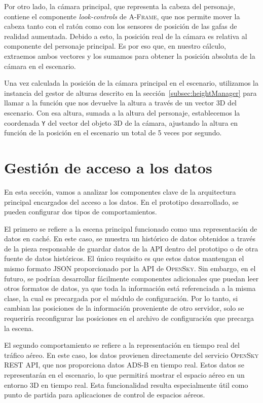 \documentclass[a4paper, 11pt]{book}
\begin{document}
Por otro lado, la cámara principal, que representa la cabeza del personaje, contiene el componente \emph{look-controls} de \textsc{A-Frame}, que nos permite mover la cabeza tanto con el ratón como con los sensores de posición de las gafas de realidad aumentada.
Debido a esto, la posición real de la cámara es relativa al componente del personaje principal. Es por eso que, en nuestro cálculo, extraemos ambos vectores y los sumamos para obtener la posición absoluta de la cámara en el escenario.

Una vez calculada la posición de la cámara principal en el escenario, utilizamos la instancia del gestor de alturas descrito en la sección~\ref{subsec:heightManager} para llamar a la función que nos devuelve la altura a través de un vector 3D del escenario. Con esa altura, sumada a la altura del personaje, establecemos la coordenada \texttt{Y} del vector del objeto \textsc{3D} de la cámara, ajustando la altura en función de la posición en el escenario un total de 5 veces por segundo.

\section{Gestión de acceso a los datos}
\label{sec:data}
En esta sección, vamos a analizar los componentes clave de la arquitectura principal encargados del acceso a los datos. En el prototipo desarrollado, se pueden configurar dos tipos de comportamientos.

El primero se refiere a la escena principal funcionado como una representación de datos en caché. En este caso, se muestra un histórico de datos obtenidos a través de la pieza responsable de guardar datos de la \textsc{API} dentro del prototipo o de otra fuente de datos históricos. 
El único requisito es que estos datos mantengan el mismo formato \textsc{\gls{JSON}} proporcionado por la \textsc{API} de \textsc{OpenSky}. Sin embargo, en el futuro, se podrían desarrollar fácilmente componentes adicionales que puedan leer otros formatos de datos, ya que toda la información está referenciada a la misma clase, la cual es precargada por el módulo de configuración. Por lo tanto, si cambian las posiciones de la información proveniente de otro servidor, solo se requeriría reconfigurar las posiciones en el archivo de configuración que precarga la escena.

El segundo comportamiento se refiere a la representación en tiempo real del tráfico aéreo. En este caso, los datos provienen directamente del servicio\textsc{ OpenSky REST API}, que nos proporciona datos \textsc{ADS-B} en tiempo real. Estos datos se representarán en el escenario, lo que permitirá mostrar el espacio aéreo en un entorno \textsc{3D} en tiempo real. Esta funcionalidad resulta especialmente útil como punto de partida para aplicaciones de control de espacios aéreos.
\end{document}
